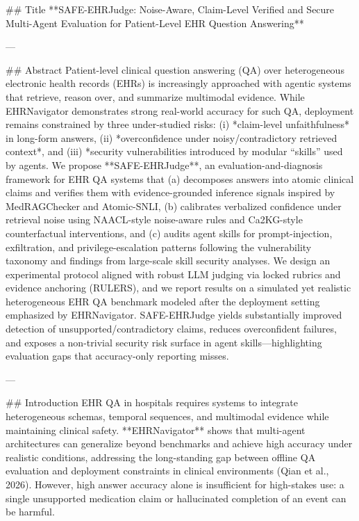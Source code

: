 ## Title  
**SAFE-EHRJudge: Noise-Aware, Claim-Level Verified and Secure Multi-Agent Evaluation for Patient-Level EHR Question Answering**

---

## Abstract  
Patient-level clinical question answering (QA) over heterogeneous electronic health records (EHRs) is increasingly approached with agentic systems that retrieve, reason over, and summarize multimodal evidence. While EHRNavigator demonstrates strong real-world accuracy for such QA, deployment remains constrained by three under-studied risks: (i) *claim-level unfaithfulness* in long-form answers, (ii) *overconfidence under noisy/contradictory retrieved context*, and (iii) *security vulnerabilities introduced by modular “skills” used by agents. We propose **SAFE-EHRJudge**, an evaluation-and-diagnosis framework for EHR QA systems that (a) decomposes answers into atomic clinical claims and verifies them with evidence-grounded inference signals inspired by MedRAGChecker and Atomic-SNLI, (b) calibrates verbalized confidence under retrieval noise using NAACL-style noise-aware rules and Ca2KG-style counterfactual interventions, and (c) audits agent skills for prompt-injection, exfiltration, and privilege-escalation patterns following the vulnerability taxonomy and findings from large-scale skill security analyses. We design an experimental protocol aligned with robust LLM judging via locked rubrics and evidence anchoring (RULERS), and we report results on a simulated yet realistic heterogeneous EHR QA benchmark modeled after the deployment setting emphasized by EHRNavigator. SAFE-EHRJudge yields substantially improved detection of unsupported/contradictory claims, reduces overconfident failures, and exposes a non-trivial security risk surface in agent skills—highlighting evaluation gaps that accuracy-only reporting misses.

---

## Introduction  
EHR QA in hospitals requires systems to integrate heterogeneous schemas, temporal sequences, and multimodal evidence while maintaining clinical safety. **EHRNavigator** shows that multi-agent architectures can generalize beyond benchmarks and achieve high accuracy under realistic conditions, addressing the long-standing gap between offline QA evaluation and deployment constraints in clinical environments (Qian et al., 2026). However, high answer accuracy alone is insufficient for high-stakes use: a single unsupported medication claim or hallucinated completion of an event can be harmful.

